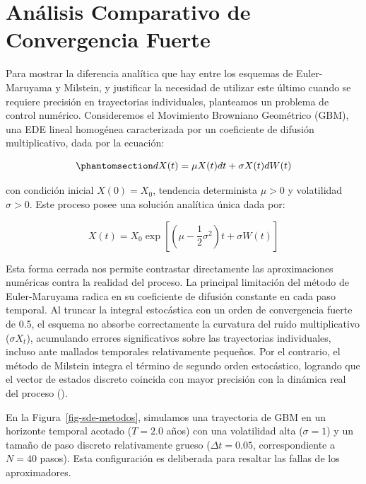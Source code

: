 \documentclass[
  spanish,
  letterpaper,
  DIV=11,
  numbers=noendperiod]{scrreprt}
\theoremstyle{plain}
\theoremstyle{definition}
\theoremstyle{remark}
\begin{document}
\section{Análisis Comparativo de Convergencia
Fuerte}\label{anuxe1lisis-comparativo-de-convergencia-fuerte}

Para mostrar la diferencia analítica que hay entre los esquemas de
Euler-Maruyama y Milstein, y justificar la necesidad de utilizar este
último cuando se requiere precisión en trayectorias individuales,
planteamos un problema de control numérico. Consideremos el Movimiento
Browniano Geométrico (GBM), una EDE lineal homogénea caracterizada por
un coeficiente de difusión multiplicativo, dada por la ecuación:

\begin{equation}\phantomsection\label{eq-ede-gbm}{
dX(t) = \mu X(t) dt + \sigma X(t) dW(t)
}\end{equation}

con condición inicial \(X(0) = X_0\), tendencia determinista \(\mu > 0\)
y volatilidad \(\sigma > 0\). Este proceso posee una solución analítica
única dada por:

\[
X(t) = X_0 \exp\left[\left(\mu - \frac{1}{2}\sigma^2\right)t + \sigma W(t)\right]
\]

Esta forma cerrada nos permite contrastar directamente las
aproximaciones numéricas contra la realidad del proceso. La principal
limitación del método de Euler-Maruyama radica en su coeficiente de
difusión constante en cada paso temporal. Al truncar la integral
estocástica con un orden de convergencia fuerte de 0.5, el esquema no
absorbe correctamente la curvatura del ruido multiplicativo
(\(\sigma X_t\)), acumulando errores significativos sobre las
trayectorias individuales, incluso ante mallados temporales
relativamente pequeños. Por el contrario, el método de Milstein integra
el término de segundo orden estocástico, logrando que el vector de
estados discreto coincida con mayor precisión con la dinámica real del
proceso ().

En la Figura~\ref{fig-sde-metodos}, simulamos una trayectoria de GBM en
un horizonte temporal acotado (\(T=2.0\) años) con una volatilidad alta
(\(\sigma = 1\)) y un tamaño de paso discreto relativamente grueso
(\(\Delta t = 0.05\), correspondiente a \(N=40\) pasos). Esta
configuración es deliberada para resaltar las fallas de los
aproximadores.
\end{document}

